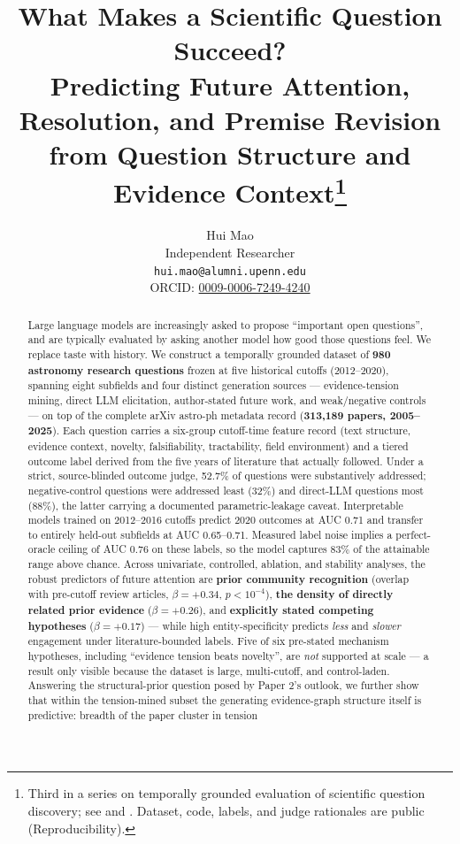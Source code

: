 \documentclass[11pt]{article}
\title{\bfseries What Makes a Scientific Question Succeed?\\[0.4em]
\large Predicting Future Attention, Resolution, and Premise Revision\\
from Question Structure and Evidence Context\thanks{Third in a series on
temporally grounded evaluation of scientific question discovery; see
\cite{paper1} and \cite{paper2}. Dataset, code, labels, and judge rationales
are public (Reproducibility).}}
\author{Hui Mao\\[0.3em]
\normalsize Independent Researcher\\
\normalsize \texttt{hui.mao@alumni.upenn.edu}\\
\normalsize ORCID: \href{https://orcid.org/0009-0006-7249-4240}{0009-0006-7249-4240}}
\date{}
\newcommand{\addressedrate}{52.7\%}
\begin{document}
\maketitle

\begin{abstract}
\noindent
Large language models are increasingly asked to propose ``important open
questions'', and are typically evaluated by asking another model how good
those questions feel. We replace taste with history. We construct a
temporally grounded dataset of \textbf{980 astronomy research questions}
frozen at five historical cutoffs (2012--2020), spanning eight subfields
and four distinct generation sources --- evidence-tension mining, direct
LLM elicitation, author-stated future work, and weak/negative controls ---
on top of the complete arXiv astro-ph metadata record (\textbf{313{,}189
papers, 2005--2025}). Each question carries a six-group cutoff-time
feature record (text structure, evidence context, novelty, falsifiability,
tractability, field environment) and a tiered outcome label derived from
the five years of literature that actually followed. Under a strict,
source-blinded outcome judge, \addressedrate{} of questions were
substantively addressed; negative-control questions were addressed least
(32\%) and direct-LLM questions most (88\%), the latter carrying a
documented parametric-leakage caveat. Interpretable models trained on
2012--2016 cutoffs predict 2020 outcomes at AUC 0.71 and transfer to
entirely held-out subfields at AUC 0.65--0.71. Measured label noise
implies a perfect-oracle ceiling of AUC 0.76 on these labels, so the
model captures 83\% of the attainable range above chance. Across univariate,
controlled, ablation, and stability analyses, the robust predictors of
future attention are \textbf{prior community recognition} (overlap with
pre-cutoff review articles, $\beta = +0.34$, $p < 10^{-4}$), \textbf{the
density of directly related prior evidence} ($\beta = +0.26$), and
\textbf{explicitly stated competing hypotheses} ($\beta = +0.17$) ---
while high entity-specificity predicts \emph{less} and \emph{slower}
engagement under literature-bounded labels. Five of six pre-stated
mechanism hypotheses, including ``evidence tension beats novelty'', are
\emph{not} supported at scale --- a result only visible because the
dataset is large, multi-cutoff, and control-laden. Answering the
structural-prior question posed by Paper 2's outlook, we further show
that within the tension-mined subset the generating evidence-graph
structure itself is predictive: breadth of the paper cluster in tension

\end{abstract}
\end{document}
